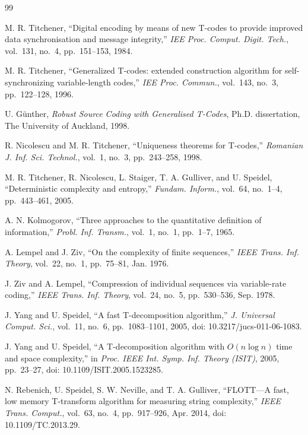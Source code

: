 \documentclass[journal]{IEEEtran}
\theoremstyle{plain}
\theoremstyle{definition}
\theoremstyle{remark}
\begin{document}
\begin{thebibliography}{99}

M. R. Titchener,
``Digital encoding by means of new T-codes to provide improved data synchronisation and message integrity,''
\emph{IEE Proc. Comput. Digit. Tech.}, vol.~131, no.~4, pp.~151--153, 1984.

M. R. Titchener,
``Generalized T-codes: extended construction algorithm for self-synchronizing variable-length codes,''
\emph{IEE Proc. Commun.}, vol.~143, no.~3, pp.~122--128, 1996.

U. G\"unther,
\emph{Robust Source Coding with Generalised T-Codes},
Ph.D. dissertation, The University of Auckland, 1998.

R. Nicolescu and M. R. Titchener,
``Uniqueness theorems for T-codes,''
\emph{Romanian J. Inf. Sci. Technol.}, vol.~1, no.~3, pp.~243--258, 1998.

M. R. Titchener, R. Nicolescu, L. Staiger, T. A. Gulliver, and U. Speidel,
``Deterministic complexity and entropy,''
\emph{Fundam. Inform.}, vol.~64, no.~1--4, pp.~443--461, 2005.

A. N. Kolmogorov,
``Three approaches to the quantitative definition of information,''
\emph{Probl. Inf. Transm.}, vol.~1, no.~1, pp.~1--7, 1965.

A. Lempel and J. Ziv,
``On the complexity of finite sequences,''
\emph{IEEE Trans. Inf. Theory}, vol.~22, no.~1, pp.~75--81, Jan. 1976.

J. Ziv and A. Lempel,
``Compression of individual sequences via variable-rate coding,''
\emph{IEEE Trans. Inf. Theory}, vol.~24, no.~5, pp.~530--536, Sep. 1978.

J. Yang and U. Speidel,
``A fast T-decomposition algorithm,''
\emph{J. Universal Comput. Sci.}, vol.~11, no.~6, pp.~1083--1101, 2005,
doi: 10.3217/jucs-011-06-1083.

J. Yang and U. Speidel,
``A T-decomposition algorithm with $O(n\log n)$ time and space complexity,''
in \emph{Proc. IEEE Int. Symp. Inf. Theory (ISIT)}, 2005, pp.~23--27,
doi: 10.1109/ISIT.2005.1523285.

N. Rebenich, U. Speidel, S. W. Neville, and T. A. Gulliver,
``FLOTT---A fast, low memory T-transform algorithm for measuring string complexity,''
\emph{IEEE Trans. Comput.}, vol.~63, no.~4, pp.~917--926, Apr. 2014,
doi: 10.1109/TC.2013.29.


\end{thebibliography}
\end{document}

